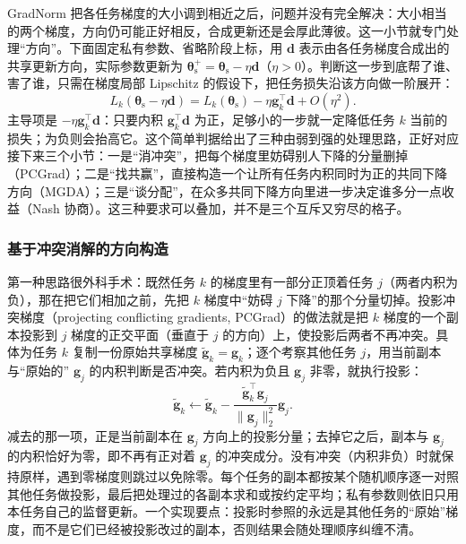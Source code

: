 GradNorm 把各任务梯度的大小调到相近之后，问题并没有完全解决：大小相当的两个梯度，方向仍可能正好相反，合成更新还是会厚此薄彼。这一小节就专门处理“方向”。下面固定私有参数、省略阶段上标，用 $\bm d$ 表示由各任务梯度合成出的共享更新方向，实际参数更新为 $\bm{\theta}_{\mathrm s}^{+}=\bm{\theta}_{\mathrm s}-\eta\bm d$（$\eta>0$）。判断这一步到底帮了谁、害了谁，只需在梯度局部 Lipschitz 的假设下，把任务损失沿该方向做一阶展开：
\begin{equation}
  L_k(\bm{\theta}_{\mathrm s}-\eta\bm d)
  =L_k(\bm{\theta}_{\mathrm s})
   -\eta\bm g_k^{\top}\bm d+O(\eta^2).
  \label{eq:ket-sharing-direction-effect}
\end{equation}
主导项是 $-\eta\bm g_k^\top\bm d$：只要内积 $\bm g_k^\top\bm d$ 为正，足够小的一步就一定降低任务 $k$ 当前的损失；为负则会抬高它。这个简单判据给出了三种由弱到强的处理思路，正好对应接下来三个小节：一是“消冲突”，把每个梯度里妨碍别人下降的分量删掉（PCGrad）；二是“找共赢”，直接构造一个让所有任务内积同时为正的共同下降方向（MGDA）；三是“谈分配”，在众多共同下降方向里进一步决定谁多分一点收益（Nash 协商）。这三种要求可以叠加，并不是三个互斥又穷尽的格子。

\subsubsection{基于冲突消解的方向构造}
\label{sec:ket-sharing-pcgrad}

第一种思路很外科手术：既然任务 $k$ 的梯度里有一部分正顶着任务 $j$（两者内积为负），那在把它们相加之前，先把 $k$ 梯度中“妨碍 $j$ 下降”的那个分量切掉。投影冲突梯度（projecting conflicting gradients, PCGrad）的做法就是把 $k$ 梯度的一个副本投影到 $j$ 梯度的正交平面（垂直于 $j$ 的方向）上，使投影后两者不再冲突。具体为任务 $k$ 复制一份原始共享梯度 $\widetilde{\bm g}_k=\bm g_k$；逐个考察其他任务 $j$，用当前副本与“原始的” $\bm g_j$ 的内积判断是否冲突。若内积为负且 $\bm g_j$ 非零，就执行投影：
\begin{equation}
  \widetilde{\bm g}_k\leftarrow
  \widetilde{\bm g}_k-
  \frac{\widetilde{\bm g}_k^{\top}\bm g_j}
       {\|\bm g_j\|_2^2}\bm g_j.
  \label{eq:ket-sharing-pcgrad-projection}
\end{equation}
减去的那一项，正是当前副本在 $\bm g_j$ 方向上的投影分量；去掉它之后，副本与 $\bm g_j$ 的内积恰好为零，即不再有正对着 $\bm g_j$ 的冲突成分。没有冲突（内积非负）时就保持原样，遇到零梯度则跳过以免除零。每个任务的副本都按某个随机顺序逐一对照其他任务做投影，最后把处理过的各副本求和或按约定平均；私有参数则依旧只用本任务自己的监督更新。一个实现要点：投影时参照的永远是其他任务的“原始”梯度，而不是它们已经被投影改过的副本，否则结果会随处理顺序纠缠不清。

